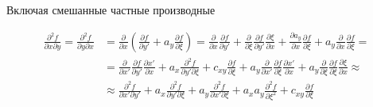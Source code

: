 Включая смешанные частные производные

\begin{equation*}
    \begin{split}
        \frac
            {\partial^2 f}
            {\partial x \partial y}
        =
        \frac
            {\partial^2 f}
            {\partial y \partial x}
        &
        =
        \frac
            {\partial}
            {\partial x}
        \left(
            \frac
                {\partial f}
                {\partial y'}
            +
            a_{y}
            \frac
                {\partial f}
                {\partial \xi}
        \right)
        =
        \frac
            {\partial}
            {\partial x}
        \frac
            {\partial f}
            {\partial y'}
        +
        \frac
            {\partial}
            {\partial \xi}
        \frac
            {\partial f}
            {\partial y'}
        \frac
            {\partial \xi}
            {\partial x}
        +
        \frac
            {\partial a_{y}}
            {\partial x}
        \frac
            {\partial f}
            {\partial \xi}
        +
        a_{y}
        \frac
            {\partial }
            {\partial x}
        \frac
            {\partial f}
            {\partial \xi}
        =
        \\
        &
        =
        \frac
            {\partial}
            {\partial x'}
        \frac
            {\partial f}
            {\partial y'}
        \frac
            {\partial x'}
            {\partial x}
        +
        a_x
        \frac
            {\partial^2 f}
            {\partial y' \partial \xi}
        +
        c_{xy}
        \frac
            {\partial f}
            {\partial \xi}
        +
        a_y
        \frac
            {\partial}
            {\partial x'}
        \frac
            {\partial f}
            {\partial \xi}
        \frac
            {\partial x'}
            {\partial x}
        +
        a_y
        \frac
            {\partial}
            {\partial \xi}
        \frac
            {\partial f}
            {\partial \xi}
        \frac
            {\partial \xi}
            {\partial x}
        \approx
        \\
        &
        \approx
        \frac
            {\partial^2 f}
            {\partial x' \partial y'}
        +
        a_x
        \frac
            {\partial^2 f}
            {\partial y' \partial \xi}
        +
        a_y
        \frac
            {\partial^2 f}
            {\partial x' \partial \xi}
        +
        a_x
        a_y
        \frac
            {\partial^2 f}
            {\partial \xi^2}
        +
        c_{xy}
        \frac
            {\partial f}
            {\partial \xi}
    \end{split}
\end{equation*}

